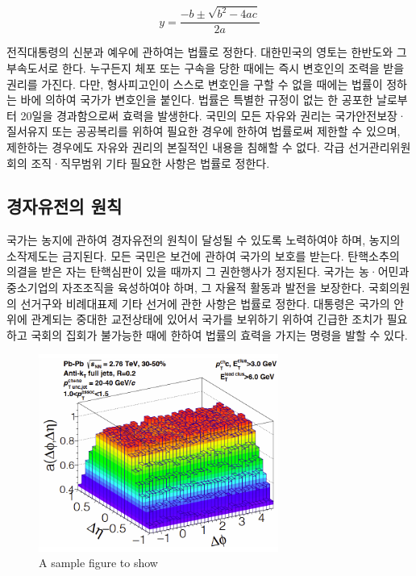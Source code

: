 \documentclass[doctor, korean]{pnuthesis}
\begin{document}
\begin{equation}
	y = \frac{-b \pm \sqrt{b^2-4ac}}{2a}
\end{equation}

전직대통령의 신분과 예우에 관하여는 법률로 정한다. 대한민국의 영토는 한반도와 그 부속도서로 한다. 누구든지 체포 또는 구속을 당한 때에는 즉시 변호인의 조력을 받을 권리를 가진다. 다만, 형사피고인이 스스로 변호인을 구할 수 없을 때에는 법률이 정하는 바에 의하여 국가가 변호인을 붙인다. 법률은 특별한 규정이 없는 한 공포한 날로부터 20일을 경과함으로써 효력을 발생한다. 국민의 모든 자유와 권리는 국가안전보장·질서유지 또는 공공복리를 위하여 필요한 경우에 한하여 법률로써 제한할 수 있으며, 제한하는 경우에도 자유와 권리의 본질적인 내용을 침해할 수 없다. 각급 선거관리위원회의 조직·직무범위 기타 필요한 사항은 법률로 정한다.

\subsection{경자유전의 원칙}

국가는 농지에 관하여 경자유전의 원칙이 달성될 수 있도록 노력하여야 하며, 농지의 소작제도는 금지된다. 모든 국민은 보건에 관하여 국가의 보호를 받는다. 탄핵소추의 의결을 받은 자는 탄핵심판이 있을 때까지 그 권한행사가 정지된다. 국가는 농·어민과 중소기업의 자조조직을 육성하여야 하며, 그 자율적 활동과 발전을 보장한다. 국회의원의 선거구와 비례대표제 기타 선거에 관한 사항은 법률로 정한다. 대통령은 국가의 안위에 관계되는 중대한 교전상태에 있어서 국가를 보위하기 위하여 긴급한 조치가 필요하고 국회의 집회가 불가능한 때에 한하여 법률의 효력을 가지는 명령을 발할 수 있다.

\begin{figure}
	\centering
	\includegraphics[width=0.7\textwidth]{figure/samplefig1.png}
	\caption{A sample figure to show}
\end{figure}
\end{document}
